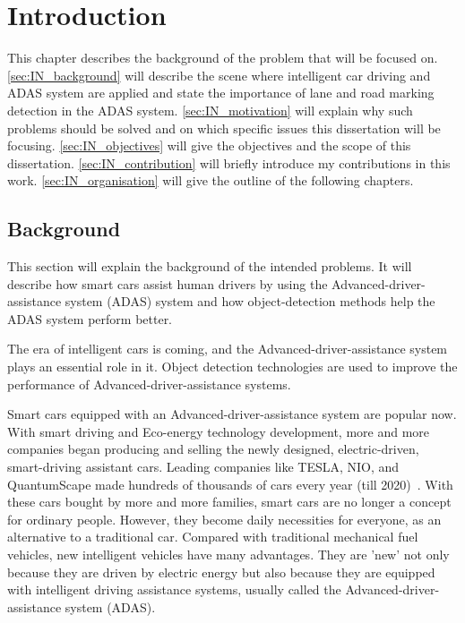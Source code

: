 
\chapter{Introduction}
\begin{spacing}{1.5}
\setlength{\parskip}{0.3in}

This chapter describes the background of the problem that will be focused on. \autoref{sec:IN_background} will describe the scene where intelligent car driving and ADAS system are applied and state the importance of lane and road marking detection in the ADAS system. \autoref{sec:IN_motivation} will explain why such problems should be solved and on which specific issues this dissertation will be focusing. \autoref{sec:IN_objectives} will give the objectives and the scope of this dissertation. \autoref{sec:IN_contribution} will briefly introduce my contributions in this work. \autoref{sec:IN_organisation} will give the outline of the following chapters.

\section{Background}
\label{sec:IN_background}

This section will explain the background of the intended problems. It will describe how smart cars assist human drivers by using the Advanced-driver-assistance system (ADAS) system and how object-detection methods help the ADAS system perform better.

The era of intelligent cars is coming, and the Advanced-driver-assistance system plays an essential role in it. Object detection technologies are used to improve the performance of Advanced-driver-assistance systems.

Smart cars equipped with an Advanced-driver-assistance system are popular now. With smart driving and Eco-energy technology development, more and more companies began producing and selling the newly designed, electric-driven, smart-driving assistant cars. Leading companies like TESLA, NIO, and QuantumScape made hundreds of thousands of cars every year (till 2020)~\cite{petranek2015we}. With these cars bought by more and more families, smart cars are no longer a concept for ordinary people. However, they become daily necessities for everyone, as an alternative to a traditional car. Compared with traditional mechanical fuel vehicles, new intelligent vehicles have many advantages. They are 'new' not only because they are driven by electric energy but also because they are equipped with intelligent driving assistance systems, usually called the Advanced-driver-assistance system (ADAS).



\end{spacing}
